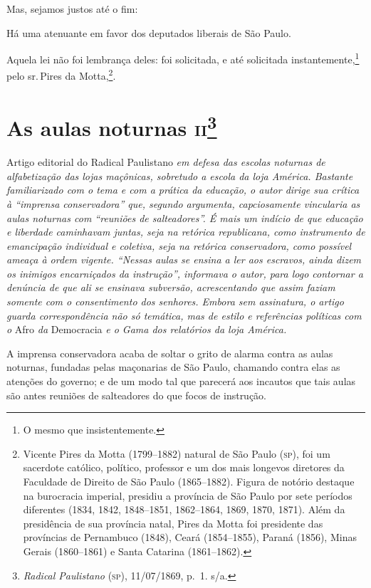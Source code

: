 \noindent\dotfill

Mas, sejamos justos até o fim:

Há uma atenuante em favor dos deputados liberais de São Paulo.

Aquela lei não foi lembrança deles: foi solicitada, e até solicitada
instantemente,\footnote{O mesmo que insistentemente.} pelo sr.\,Pires
da Motta,\footnote{Vicente Pires da Motta (1799--1882) natural de São
  Paulo (\textsc{sp}), foi um sacerdote católico, político, professor e um dos
  mais longevos diretores da Faculdade de Direito de São Paulo
  (1865--1882). Figura de notório destaque na burocracia imperial,
  presidiu a província de São Paulo por sete períodos diferentes (1834,
  1842, 1848--1851, 1862--1864, 1869, 1870, 1871). Além da presidência de
  sua província natal, Pires da Motta foi presidente das províncias de
  Pernambuco (1848), Ceará (1854--1855), Paraná (1856), Minas Gerais
  (1860--1861) e Santa Catarina (1861--1862).}.

\chapter{As aulas noturnas \textsc{ii}\footnote{\emph{Radical Paulistano}
  (\textsc{sp}), 11/07/1869, p.~1. s/a.}}

\begin{didascalia}
Artigo editorial do Radical Paulistano \emph{em defesa das escolas
noturnas de alfabetização das lojas maçônicas, sobretudo a escola da
loja América. Bastante familiarizado com o tema e com a prática da
educação, o autor dirige sua crítica à ``imprensa conservadora'' que,
segundo argumenta, capciosamente vincularia as aulas noturnas com
``reuniões de salteadores''. É mais um indício de que educação e liberdade
caminhavam juntas, seja na retórica republicana, como instrumento de
emancipação individual e coletiva, seja na retórica conservadora, como
possível ameaça à ordem vigente. ``Nessas aulas se ensina a ler aos
escravos, ainda dizem os inimigos encarniçados da instrução'', informava
o autor, para logo contornar a denúncia de que ali se ensinava
subversão, acrescentando que assim faziam somente com o consentimento
dos senhores. Embora sem assinatura, o artigo guarda correspondência não
só temática, mas de estilo e referências políticas com o} Afro \emph{da}
Democracia \emph{e o Gama dos relatórios da loja América.}
\end{didascalia}

A imprensa conservadora acaba de soltar o grito de alarma contra as
aulas noturnas, fundadas pelas maçonarias de São Paulo, chamando contra
elas as atenções do governo; e de um modo tal que parecerá aos incautos
que tais aulas são antes reuniões de salteadores do que focos de
instrução.

